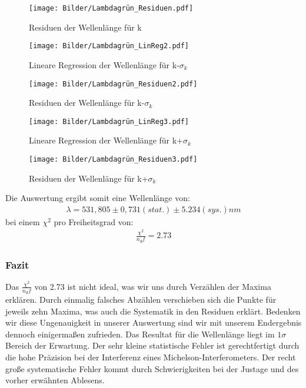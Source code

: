 \documentclass[12pt,a4paper]{article}
\begin{document}
\begin{figure}[H]
\centering
\texttt{[image: Bilder/Lambdagrün\_Residuen.pdf]}
\caption{Residuen der Wellenlänge für k}
\end{figure}

\begin{figure}[H]
\centering
\texttt{[image: Bilder/Lambdagrün\_LinReg2.pdf]}
\caption{Lineare Regression der Wellenlänge für k-$\sigma_k$}
\end{figure}

\begin{figure}[H]
\centering
\texttt{[image: Bilder/Lambdagrün\_Residuen2.pdf]}
\caption{Residuen der Wellenlänge für k-$\sigma_k$}
\end{figure}

\begin{figure}[H]
\centering
\texttt{[image: Bilder/Lambdagrün\_LinReg3.pdf]}
\caption{Lineare Regression der Wellenlänge für k+$\sigma_k$}
\end{figure}

\begin{figure}[H]
\centering
\texttt{[image: Bilder/Lambdagrün\_Residuen3.pdf]}
\caption{Residuen der Wellenlänge für k+$\sigma_k$}
\end{figure}

Die Auswertung ergibt somit eine Wellenlänge von:
\begin{align*}
\lambda = 531,805 \pm 0,731(stat.) \pm 5.234(sys.) nm
\end{align*}
bei einem $\chi^2$ pro Freiheitsgrad von:
\begin{align*}
\frac{\chi^2}{n_df} = 2.73
\end{align*}

\subsubsection{Fazit}
Das $\frac{\chi^2}{n_df}$ von 2.73 ist nicht ideal, was wir uns durch Verzählen der Maxima erklären. Durch einmalig falsches Abzählen verschieben sich die Punkte für jeweils zehn Maxima, was auch die Systematik in den Residuen erklärt.
Bedenken wir diese Ungenauigkeit in unserer Auswertung sind wir mit unserem Endergebnis dennoch einigermaßen zufrieden. Das Resultat für die Wellenlänge liegt im $1\sigma$ Bereich der Erwartung. Der sehr kleine statistische Fehler ist gerechtfertigt durch die hohe Präzision bei der Interferenz eines Michelson-Interferometers. Der recht große systematische Fehler kommt durch Schwierigkeiten bei der Justage und des vorher erwähnten Ablesens.
\end{document}

